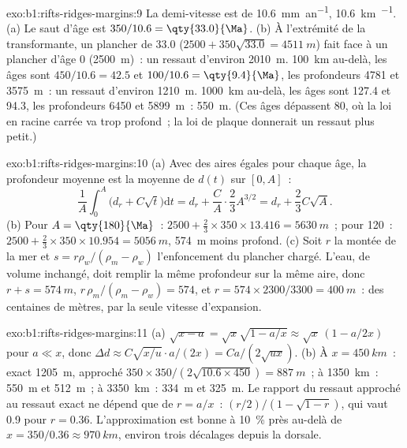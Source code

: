 \begin{solution}{exo:b1:rifts-ridges-margins:9}
La demi-vitesse est de \qty{10.6}{mm.an^{-1}}, \qty{10.6}{km.\Ma^{-1}}. (a) Le saut
d'âge est $350/10.6 = \qty{33.0}{\Ma}$. (b) À l'extrémité de la transformante, un plancher
de \qty{33.0}{\Ma} ($2500 + 350\sqrt{33.0} = \qty{4511}{m}$) fait face à un plancher
d'âge 0 (\qty{2500}{m})~: un ressaut d'environ \qty{2010}{m}. \qty{100}{km} au-delà,
les âges sont $450/10.6 = 42.5$ et $100/10.6 = \qty{9.4}{\Ma}$, les profondeurs
4781 et \qty{3575}{m}~: un ressaut d'environ \qty{1210}{m}. \qty{1000}{km} au-delà,
les âges sont 127.4 et \qty{94.3}{\Ma}, les profondeurs 6450 et \qty{5899}{m}~:
\qty{550}{m}. (Ces âges dépassent \qty{80}{\Ma}, où la loi en racine carrée
va trop profond~; la loi de plaque donnerait un ressaut plus petit.)
\end{solution}

\begin{solution}{exo:b1:rifts-ridges-margins:10}
(a) Avec des aires égales pour chaque âge, la profondeur moyenne est la moyenne de $d(t)$ sur
$[0, A]$~:
\[
  \frac1A\int_0^A\bigl(d_r + C\sqrt t\bigr)\mathrm dt = d_r + \frac CA\cdot\frac23A^{3/2}
  = d_r + \frac23C\sqrt A.
\]
(b) Pour $A = \qty{180}{\Ma}$~: $2500 + \frac23\times350\times13.416 =
\qty{5630}{m}$~; pour \qty{120}{\Ma}~: $2500 + \frac23\times350\times10.954 =
\qty{5056}{m}$, \qty{574}{m} moins profond. (c) Soit $r$ la montée de la mer et $s = r\rho_w/(\rho_m - \rho_w)$
l'enfoncement du plancher chargé. L'eau, de volume inchangé,
doit remplir la même profondeur sur la même aire, donc $r + s = \qty{574}{m}$,
$r\,\rho_m/(\rho_m - \rho_w) = 574$, et $r = 574\times2300/3300 =
\qty{400}{m}$~: des centaines de mètres, par la seule vitesse d'expansion.
\end{solution}

\begin{solution}{exo:b1:rifts-ridges-margins:11}
(a) $\sqrt{x - a} = \sqrt x\sqrt{1 - a/x} \approx \sqrt x\,(1 - a/2x)$ pour
$a \ll x$, donc
$\Delta d \approx C\sqrt{x/u}\cdot a/(2x) = Ca/(2\sqrt{ux})$.
(b) À $x = \qty{450}{km}$~: exact \qty{1205}{m}, approché
$350\times350/(2\sqrt{10.6\times450}) = \qty{887}{m}$~; à \qty{1350}{km}~:
\qty{550}{m} et \qty{512}{m}~; à \qty{3350}{km}~: \qty{334}{m} et
\qty{325}{m}. Le rapport du ressaut approché au ressaut exact ne dépend que de
$r = a/x$~: $(r/2)/(1 - \sqrt{1 - r})$, qui vaut 0.9 pour $r = 0.36$.
L'approximation est bonne à \qty{10}{\percent} près au-delà de $x = 350/0.36 \approx
\qty{970}{km}$, environ trois décalages depuis la dorsale.
\end{solution}

